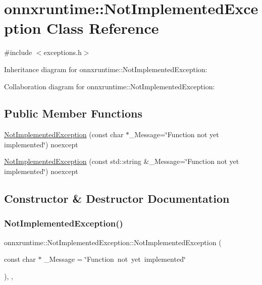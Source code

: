 \hypertarget{classonnxruntime_1_1NotImplementedException}{}\section{onnxruntime\+:\+:Not\+Implemented\+Exception Class Reference}
\label{classonnxruntime_1_1NotImplementedException}


{\ttfamily \#include $<$exceptions.\+h$>$}



Inheritance diagram for onnxruntime\+:\+:Not\+Implemented\+Exception\+:


Collaboration diagram for onnxruntime\+:\+:Not\+Implemented\+Exception\+:
\subsection*{Public Member Functions}
\begin{DoxyCompactItemize}
\item 
\mbox{\hyperlink{classonnxruntime_1_1NotImplementedException_a2b51f4b4d58d6aabfe498be3d9878215}{Not\+Implemented\+Exception}} (const char $\ast$\+\_\+\+Message=\char`\"{}Function not yet implemented\char`\"{}) noexcept
\item 
\mbox{\hyperlink{classonnxruntime_1_1NotImplementedException_a4d992d62f2fe206f66728de44b6c18cc}{Not\+Implemented\+Exception}} (const std\+::string \&\+\_\+\+Message=\char`\"{}Function not yet implemented\char`\"{}) noexcept
\end{DoxyCompactItemize}


\subsection{Constructor \& Destructor Documentation}
\mbox{\label{classonnxruntime_1_1NotImplementedException_a2b51f4b4d58d6aabfe498be3d9878215}} 
\subsubsection{\texorpdfstring{Not\+Implemented\+Exception()}{NotImplementedException()}\hspace{0.1cm}{\footnotesize\ttfamily [1/2]}}
{\footnotesize\ttfamily onnxruntime\+::\+Not\+Implemented\+Exception\+::\+Not\+Implemented\+Exception (\begin{DoxyParamCaption}\item[{const char $\ast$}]{\+\_\+\+Message = {\ttfamily \char`\"{}Function~not~yet~implemented\char`\"{}} }\end{DoxyParamCaption})\hspace{0.3cm}{\ttfamily [inline]}, {\ttfamily [explicit]}, {\ttfamily [noexcept]}}

